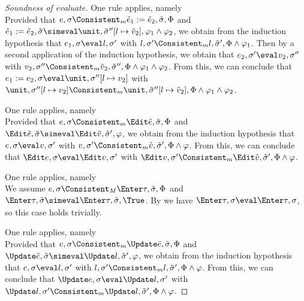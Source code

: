 \begin{proof}[Soundness of evaluate]
    {
    One rule applies, namely \\
    Provided that $e,\sigma\Consistent_m\tilde{e}_1:=\tilde{e}_2,\tilde{\sigma},\Phi$ and $\tilde{e}_1:=\tilde{e}_2,\tilde{\sigma}\simeval\unit,\tilde{\sigma}''[l\mapsto \tilde{v}_2],\phi_1\land\phi_2$,
    we obtain from the induction hypothesis that $e_1,\sigma\eval l,\sigma'$ with $l,\sigma'\Consistent_m l,\tilde{\sigma}',\Phi\land\phi_1$.
    Then by a second application of the induction hypothesis, we obtain that $e_2,\sigma'\eval v_2,\sigma''$ with $v_2,\sigma''\Consistent_m\tilde{v}_2,\tilde{\sigma}'',\Phi\land\phi_1\land\phi_2$.
    From this, we can conclude that $e_1 := e_2,\sigma\eval \unit,\sigma''[l\mapsto v_2]$ with $\unit,\sigma''[l\mapsto v_2]\Consistent_m\unit,\tilde{\sigma}''[l\mapsto\tilde{v}_2],\Phi\land\phi_1\land\phi_2$.
    }

    {One rule applies, namely \\
    Provided that $e,\sigma\Consistent_m \Edit\tilde{e},\tilde{\sigma},\Phi$ and $\Edit\tilde{e},\tilde{\sigma}\simeval\Edit\tilde{v},\tilde{\sigma}',\phi$,
    we obtain from the induction hypothesis that $e,\sigma\eval v,\sigma'$ with $v,\sigma'\Consistent_m \tilde{v},\tilde{\sigma}',\Phi\land\phi$.
    From this, we can conclude that $\Edit e,\sigma\eval \Edit v,\sigma'$ with $\Edit v,\sigma'\Consistent_m \Edit\tilde{v},\tilde{\sigma}',\Phi\land\phi$.

    }

    {
    One rule applies, namely \\
    We assume $e,\sigma\Consistent_M\Enter\tau,\tilde{\sigma},\Phi$ and $\Enter\tau,\tilde{\sigma}\simeval\Enter\tau,\tilde{\sigma},\True$.
    By  we have $\Enter\tau,\sigma\eval \Enter\tau,\sigma$, so this case holds trivially.
    }

    {One rule applies, namely \\
    Provided that $e,\sigma\Consistent_m \Update\tilde{e},\tilde{\sigma},\Phi$ and $\Update\tilde{e},\tilde{\sigma}\simeval\Update l,\tilde{\sigma}',\phi$,
    we obtain from the induction hypothesis that $e,\sigma\eval l,\sigma'$ with $l,\sigma'\Consistent_m l,\tilde{\sigma}',\Phi\land\phi$.
    From this, we can conclude that $\Update e,\sigma\eval \Update l ,\sigma'$ with $\Update l,\sigma'\Consistent_m \Update l,\tilde{\sigma}',\Phi\land\phi$.

}
\end{proof}
